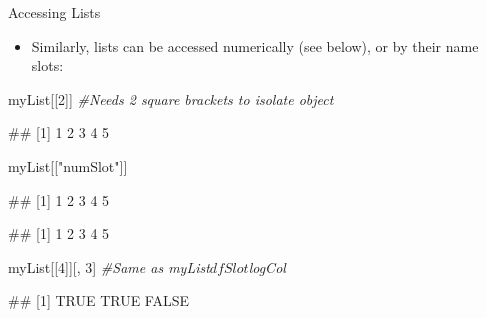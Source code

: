 \documentclass[
  ignorenonframetext,
  aspectratio=169]{beamer}
\newenvironment{Shaded}{\begin{snugshade}}{\end{snugshade}}
\newcommand{\CommentTok}[1]{\textcolor[rgb]{0.56,0.35,0.01}{\textit{#1}}}
\newcommand{\DecValTok}[1]{\textcolor[rgb]{0.00,0.00,0.81}{#1}}
\newcommand{\NormalTok}[1]{#1}
\newcommand{\SpecialCharTok}[1]{\textcolor[rgb]{0.81,0.36,0.00}{\textbf{#1}}}
\newcommand{\StringTok}[1]{\textcolor[rgb]{0.31,0.60,0.02}{#1}}
\providecommand{\tightlist}{%
  \setlength{\itemsep}{0pt}\setlength{\parskip}{0pt}}
\let\oldShaded\Shaded %
\let\endoldShaded\endShaded
\renewenvironment{Shaded}{\footnotesize\oldShaded}{\endoldShaded}
\let\oldverbatim\verbatim %Change fontsize of code chunk output
\let\endoldverbatim\endverbatim
\renewenvironment{verbatim}{\footnotesize\oldverbatim}{\endoldverbatim}
\begin{document}
\begin{frame}[fragile]{Accessing Lists}
\protect\hypertarget{accessing-lists}{}
\begin{itemize}[<+->]
\tightlist
\item
  Similarly, lists can be accessed numerically (see below), or by their
  name slots:
\end{itemize}

\begin{Shaded}
\begin{Highlighting}[]
\NormalTok{myList[[}\DecValTok{2}\NormalTok{]]  }\CommentTok{\#Needs 2 square brackets to isolate object}
\end{Highlighting}
\end{Shaded}

\begin{verbatim}
## [1] 1 2 3 4 5
\end{verbatim}

\begin{Shaded}
\begin{Highlighting}[]
\NormalTok{myList[[}\StringTok{"numSlot"}\NormalTok{]]}
\end{Highlighting}
\end{Shaded}

\begin{verbatim}
## [1] 1 2 3 4 5
\end{verbatim}

\begin{Shaded}
\end{Shaded}

\begin{verbatim}
## [1] 1 2 3 4 5
\end{verbatim}

\begin{Shaded}
\begin{Highlighting}[]
\NormalTok{myList[[}\DecValTok{4}\NormalTok{]][, }\DecValTok{3}\NormalTok{]  }\CommentTok{\#Same as myList$dfSlot$logCol}
\end{Highlighting}
\end{Shaded}

\begin{verbatim}
## [1]  TRUE  TRUE FALSE
\end{verbatim}
\end{frame}
\end{document}
